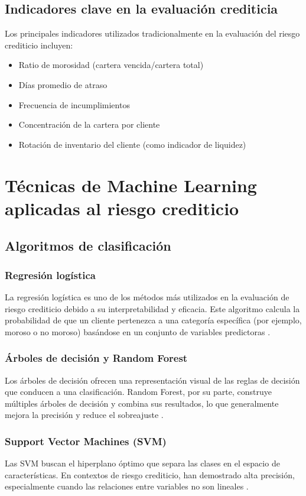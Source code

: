 \subsection{Indicadores clave en la evaluación crediticia}
Los principales indicadores utilizados tradicionalmente en la evaluación del riesgo crediticio incluyen:

\begin{itemize}
    \item Ratio de morosidad (cartera vencida/cartera total)
    \item Días promedio de atraso
    \item Frecuencia de incumplimientos
    \item Concentración de la cartera por cliente
    \item Rotación de inventario del cliente (como indicador de liquidez)
\end{itemize}

\section{Técnicas de Machine Learning aplicadas al riesgo crediticio}
\subsection{Algoritmos de clasificación}
\subsubsection{Regresión logística}
La regresión logística es uno de los métodos más utilizados en la evaluación de riesgo crediticio debido a su interpretabilidad y eficacia. Este algoritmo calcula la probabilidad de que un cliente pertenezca a una categoría específica (por ejemplo, moroso o no moroso) basándose en un conjunto de variables predictoras \cite{garcia2024machine}.

\subsubsection{Árboles de decisión y Random Forest}
Los árboles de decisión ofrecen una representación visual de las reglas de decisión que conducen a una clasificación. Random Forest, por su parte, construye múltiples árboles de decisión y combina sus resultados, lo que generalmente mejora la precisión y reduce el sobreajuste \cite{ramirez2023predictive}.

\subsubsection{Support Vector Machines (SVM)}
Las SVM buscan el hiperplano óptimo que separa las clases en el espacio de características. En contextos de riesgo crediticio, han demostrado alta precisión, especialmente cuando las relaciones entre variables no son lineales \cite{torres2023inteligencia}.

